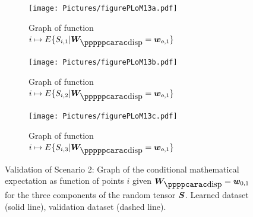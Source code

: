 \begin{figure}[!htb]
    \begin{center}
        \begin{subfigure}[b]{0.32\textwidth}
            \begin{center}
                \texttt{[image: Pictures/figurePLoM13a.pdf]}
            \end{center}
                \caption{Graph of function $i\mapsto E\{ S_{i,1} \vert \bfW_\disppp = \bfw_{o,1} \}$}
                \label{fig:figurePLoM13a}
            \end{subfigure}
            \centering
            \begin{subfigure}[b]{0.32\textwidth}
                \begin{center}
                    \texttt{[image: Pictures/figurePLoM13b.pdf]}
                \end{center}
                \caption{Graph of function $i\mapsto E\{ S_{i,2} \vert \bfW_\disppp = \bfw_{o,1} \}$}
                \label{fig:figurePLoM13b}
            \end{subfigure}
            \centering
            \begin{subfigure}[b]{0.32\textwidth}
                \begin{center}
                    \texttt{[image: Pictures/figurePLoM13c.pdf]}
                \end{center}
                \caption{Graph of function $i\mapsto E\{ S_{i,3} \vert \bfW_\disppp = \bfw_{o,1} \}$}
                \label{fig:figurePLoM13c}
            \end{subfigure}
    \end{center}
    \caption[Validation of Scenario 2: Graph of the conditional mathematical expectation.]{Validation of Scenario 2: Graph of the conditional mathematical expectation as function of points $i$ given $\bfW_\dispp =\bfw_{0,1}$ for the three components of the random tensor ${\boldsymbol{S}}$.  Learned dataset (solid line), validation dataset (dashed line).}
    \label{fig:figurePLoM13}
\end{figure}
%
